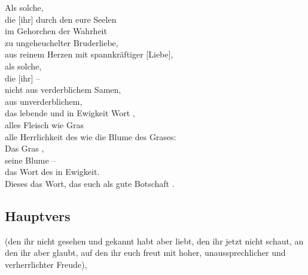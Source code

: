     Als solche, \\
        die [ihr] durch den  eure Seelen \\
        im Gehorchen der Wahrheit  \\
        zu ungeheuchelter Bruderliebe, \\
              aus reinem Herzen mit spannkräftiger [Liebe], \\
            als solche, \\
                die [ihr]  – \\
                nicht aus verderblichem Samen, \\
             aus unverderblichem, \\
                 das lebende und in Ewigkeit  Wort , \\
                 alles Fleisch wie Gras  \\
                 alle Herrlichkeit des  wie die Blume des Grases: \\
                    Das Gras , \\
                     seine Blume  – \\
                         das Wort des   in Ewigkeit.\\

    Dieses  das Wort, das euch als gute Botschaft . 

    \subsection{Hauptvers}
    
    (den ihr nicht gesehen und gekannt habt aber liebt, den ihr jetzt nicht schaut, an den ihr aber glaubt, auf den ihr euch freut mit hoher, unaussprechlicher und verherrlichter Freude),


